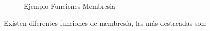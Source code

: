 \documentclass[
  a4paper,
  DIV=11,
  numbers=noendperiod]{scrreprt}
\begin{document}
\begin{figure}


\caption{\label{fig-funcion_membresia_ejemplo}Ejemplo Funciones
Membresia}

\end{figure}%

Existen diferentes funciones de membresía, las más destacadas son:
\end{document}
